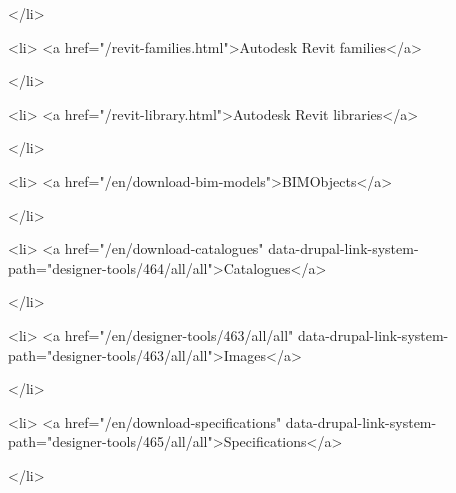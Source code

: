             </li>
        
                   
            
      
            
    

                    <li>
                  <a href="/revit-families.html">Autodesk Revit families</a>
                    
            </li>
        
                   
            
      
            
    

                    <li>
                  <a href="/revit-library.html">Autodesk Revit libraries</a>
                    
            </li>
        
                   
            
      
            
    

                    <li>
                  <a href="/en/download-bim-models">BIMObjects</a>
                    
            </li>
        
                   
            
      
            
    

                    <li>
                  <a href="/en/download-catalogues" data-drupal-link-system-path="designer-tools/464/all/all">Catalogues</a>
                    
            </li>
        
                   
            
      
            
    

                    <li>
                  <a href="/en/designer-tools/463/all/all" data-drupal-link-system-path="designer-tools/463/all/all">Images</a>
                    
            </li>
        
                   
            
      
            
    

                    <li>
                  <a href="/en/download-specifications" data-drupal-link-system-path="designer-tools/465/all/all">Specifications</a>
                    
            </li>
        
